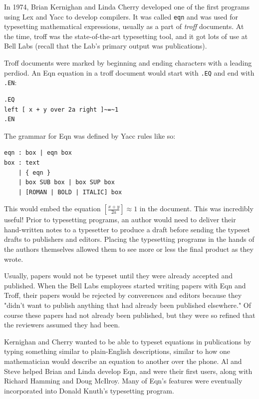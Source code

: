 In 1974, Brian Kernighan and Linda Cherry developed one of the first programs
using Lex and Yacc to develop compilers.
It was called \texttt{eqn} and was used for typesetting mathematical expressions,
usually as a part of \textit{troff} documents.
At the time, troff was the state-of-the-art typesetting tool,
and it got lots of use at Bell Labs (recall that the Lab's primary output was publications).

Troff documents were marked by beginning and ending characters with a leading perdiod.
An Eqn equation in a troff document would start with \texttt{.EQ} and end with \texttt{.EN}\cite{kernighan_cherry_eqn_1975}:

\begin{lstlisting}[frame=single]
.EQ
left [ x + y over 2a right ]~=~1
.EN
\end{lstlisting}

The grammar for Eqn was defined by Yacc rules like so:

\begin{lstlisting}[frame=single]
eqn : box | eqn box
box : text
    | { eqn }
    | box SUB box | box SUP box
    | [ROMAN | BOLD | ITALIC] box
\end{lstlisting}

This would embed the equation $ [ \frac{x + y}{2a} ] \approx 1 $ in the document.
This was incredibly useful! Prior to typesetting programs, an author would need to deliver their
hand-written notes to a typesetter to produce a draft before sending the typeset drafts to
publishers and editors. Placing the typesetting programs in the hands of the authors themselves
allowed them to see more or less the final product as they wrote.

Usually, papers would not be typeset until they were already accepted and published.
When the Bell Labs employees started writing papers with Eqn and Troff, their papers
would be rejected by converences and editors because they "didn't want to publish anything that
had already been published elsewhere."
Of course these papers had not already been published, but they were so refined
that the reviewers assumed they had been.

Kernighan and Cherry wanted to be able to typeset equations in publications by typing
something similar to plain-English descriptions, similar to how one mathematician would
describe an equation to another over the phone.
Al and Steve helped Brian and Linda develop Eqn, and were their first users,
along with Richard Hamming and Doug McIlroy.
Many of Eqn's features were eventually incorporated into Donald Knuth's \tex typesetting program.

